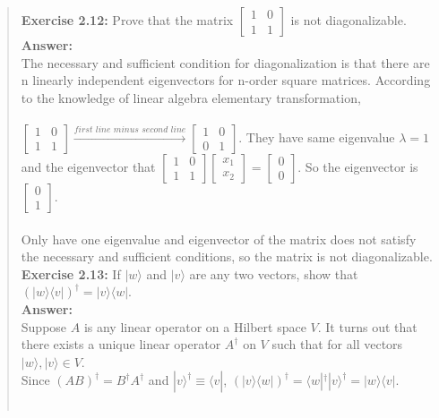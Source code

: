 \documentclass[UTF8]{ctexart}
\begin{document}
\begin{quote}
\textbf{Exercise 2.12:  } Prove that the matrix   $\begin{bmatrix}1&0\\1	&1\end{bmatrix}$ is not diagonalizable. 
	\\ 
\textbf{Answer:}\\
		 \hspace*{0.6cm}The necessary and sufficient condition for diagonalization is that there are n linearly independent eigenvectors for n-order square matrices. According to the knowledge of linear algebra elementary transformation,\\ \\
	 $\begin{bmatrix}1&0\\1&1\end{bmatrix}\xrightarrow{first\,\, line \,\,minus\,\, second\,\, line} \begin{bmatrix}1&0\\0&1\end{bmatrix}$. They have same eigenvalue $\lambda=1$ and the eigenvector  that  
	$\begin{bmatrix}1&0\\1&1\end{bmatrix}\begin{bmatrix}x_{1}\\x_{2}\end{bmatrix}
	=\begin{bmatrix}0\\0\end{bmatrix}$.
	So the eigenvector is $\begin{bmatrix}0\\1\end{bmatrix}$. \\ \\
	Only have one eigenvalue and eigenvector of the matrix does not satisfy the necessary and sufficient conditions, so the matrix is not diagonalizable. 
	\\
	
	
\textbf{Exercise 2.13:} If $|w\rangle$ and $|v\rangle$ are any two vectors, show that $(|w\rangle\langle v|)^{\dagger}=|v\rangle\langle w|$. \\
\textbf{Answer:}\\
	 \hspace*{0.6cm}Suppose $A$ is any linear operator on a Hilbert space $V$. It turns out that there exists a unique linear operator $A^{\dagger}$ on $ V$ such that for all vectors $ |w\rangle ,| v\rangle \in V$. \\ 
	Since $(AB)^{\dagger}=B^{\dagger}A^{\dagger}$ and  $|v\rangle^{\dagger}\equiv\langle v|$, $(|v\rangle\langle w|)^{\dagger}=\langle w|^{\dagger} | v\rangle^{\dagger}=|w\rangle\langle v|$. \\ \\
	

\end{quote}
\end{document}
